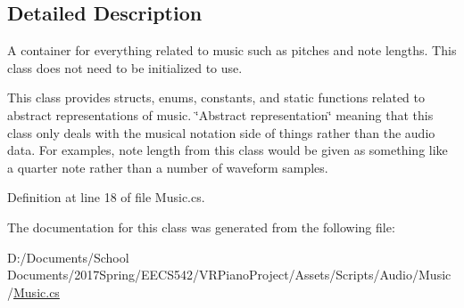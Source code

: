 \subsection{Detailed Description}
A container for everything related to music such as pitches and note lengths. This class does not need to be initialized to use. 

This class provides structs, enums, constants, and static functions related to abstract representations of music. \char`\"{}\+Abstract representation\char`\"{} meaning that this class only deals with the musical notation side of things rather than the audio data. For examples, note length from this class would be given as something like a quarter note rather than a number of waveform samples. 

Definition at line 18 of file Music.\+cs.



The documentation for this class was generated from the following file\+:\begin{DoxyCompactItemize}
\item 
D\+:/\+Documents/\+School Documents/2017\+Spring/\+E\+E\+C\+S542/\+V\+R\+Piano\+Project/\+Assets/\+Scripts/\+Audio/\+Music/\hyperlink{_music_8cs}{Music.\+cs}\end{DoxyCompactItemize}
